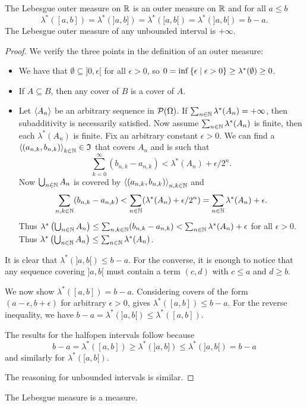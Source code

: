 \begin{lemma}
The Lebesgue outer measure on $\mathbb{R}$ is an outer measure on $\mathbb{R}$ and for all $a
\leq b$
\[ \lambda^*([a,b]) = \lambda^*(]a,b]) = \lambda^*([a,b[) = \lambda^*(]a,b[) = b-a. \]
The Lebesgue outer measure of any unbounded interval is $+\infty$.
\end{lemma}
\begin{proof}
We verify the three points in the definition of an outer measure:
\begin{itemize}
\item We have that $\emptyset \subseteq ]0,\epsilon[$ for all $\epsilon > 0$, so  $0 = \inf\left\{ \epsilon \;\middle|\; \epsilon > 0 \right\} \geq \lambda^*(\emptyset) \geq 0$.
\item If $A\subseteq B$, then any cover of $B$ is a cover of $A$.
\item Let $\left\langle A_n \right\rangle$ be an arbitrary sequence in $\operatorname{\mathcal{P}}(\Omega)$. If $\sum_{n\in\mathbb{N}}\lambda^*(A_n) = +\infty$, then subadditivity is necessarily satisfied. Now assume $\sum_{n\in\mathbb{N}}\lambda^*(A_n)$ is finite, then each $\lambda^*(A_n)$ is finite. Fix an arbitrary constant $\epsilon > 0$. We can find a $\left\langle (a_{n,k},b_{n,k}) \right\rangle_{k\in\mathbb{N}}\in \mathfrak{I}$ that covers $A_n$ and is such that
\[ \sum_{k=0}^\infty(b_{n,k} - a_{n,k}) < \lambda^*(A_n) + \epsilon/2^n. \]
Now $\bigcup_{n\in \mathbb{N}}A_n$ is covered by $\left\langle (a_{n,k},b_{n,k}) \right\rangle_{n,k\in\mathbb{N}}$ and
\[ \sum_{n,k \in\mathbb{N}} (b_{n,k} - a_{n,k}) < \sum_{n\in \mathbb{N}}(\lambda^*(A_n) + \epsilon/2^n) = \sum_{n\in \mathbb{N}}\lambda^*(A_n) + \epsilon. \]
Thus $\lambda^*\left(\bigcup_{n\in \mathbb{N}}A_n\right) \leq \sum_{n,k \in\mathbb{N}} (b_{n,k} - a_{n,k}) < \sum_{n\in \mathbb{N}}\lambda^*(A_n) + \epsilon$ for all $\epsilon > 0$. Thus $\lambda^*\left(\bigcup_{n\in \mathbb{N}}A_n\right) \leq \sum_{n\in \mathbb{N}}\lambda^*(A_n)$.
\end{itemize}
It is clear that $\lambda^*(]a,b[) \leq b-a$. For the converse, it is enough to notice that any sequence covering $]a,b[$ must contain a term $(c,d)$ with $c\leq a$ and $d\geq b$. 

We now show $\lambda^*([a,b]) = b-a$. Considering covers of the form $(a-\epsilon, b+\epsilon)$ for arbitrary $\epsilon > 0$, gives $\lambda^*([a,b]) \leq b-a$. For the reverse inequality, we have $b-a = \lambda^*(]a,b[) \leq \lambda^*([a,b])$.

The results for the halfopen intervals follow because 
\[ b-a = \lambda^*([a,b]) \geq \lambda^*(]a,b]) \leq \lambda^*(]a,b[) = b-a \]
and similarly for $\lambda^*([a,b[)$.

The reasoning for unbounded intervals is similar.
\end{proof}
\begin{corollary}
The Lebesgue measure is a measure.
\end{corollary}

